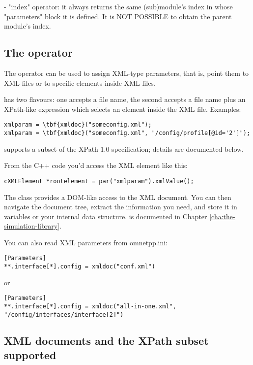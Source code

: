 - "index" operator: it always returns the same (sub)module's index in whose "parameters"
   block it is defined. It is NOT POSSIBLE to obtain the parent module's index.


\subsection{The  operator}

The  operator can be used to assign XML-type parameters,
that is, point them to XML files or to specific elements inside XML files.

 has two flavours: one accepts a file name, the second accepts
a file name plus an XPath-like expression which selects an element
inside the XML file. Examples:

\begin{Verbatim}[commandchars=\\\{\}]
xmlparam = \tbf{xmldoc}("someconfig.xml");
xmlparam = \tbf{xmldoc}("someconfig.xml", "/config/profile[@id='2']");
\end{Verbatim}

{\opp} supports a subset of the XPath 1.0 specification; details are
documented below.

From the C++ code you'd access the XML element like this:

\begin{verbatim}
cXMLElement *rootelement = par("xmlparam").xmlValue();
\end{verbatim}

The  class provides a DOM-like access to the XML document.
You can then navigate the document tree, extract the information you need,
and store it in variables or your internal data structure.
 is documented in Chapter \ref{cha:the-simulation-library}.

You can also read XML parameters from omnetpp.ini:

\begin{verbatim}
[Parameters]
**.interface[*].config = xmldoc("conf.xml")
\end{verbatim}

or

\begin{verbatim}
[Parameters]
**.interface[*].config = xmldoc("all-in-one.xml", "/config/interfaces/interface[2]")
\end{verbatim}


\subsection{XML documents and the XPath subset supported}


